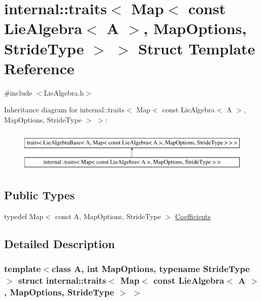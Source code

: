 \hypertarget{structinternal_1_1traits_3_01_map_3_01const_01_lie_algebra_3_01_a_01_4_00_01_map_options_00_01_stride_type_01_4_01_4}{}\section{internal\+:\+:traits$<$ Map$<$ const Lie\+Algebra$<$ A $>$, Map\+Options, Stride\+Type $>$ $>$ Struct Template Reference}
\label{structinternal_1_1traits_3_01_map_3_01const_01_lie_algebra_3_01_a_01_4_00_01_map_options_00_01_stride_type_01_4_01_4}


{\ttfamily \#include $<$Lie\+Algebra.\+h$>$}

Inheritance diagram for internal\+:\+:traits$<$ Map$<$ const Lie\+Algebra$<$ A $>$, Map\+Options, Stride\+Type $>$ $>$\+:\begin{figure}[H]
\begin{center}
\leavevmode
\includegraphics[height=2.000000cm]{structinternal_1_1traits_3_01_map_3_01const_01_lie_algebra_3_01_a_01_4_00_01_map_options_00_01_stride_type_01_4_01_4}
\end{center}
\end{figure}
\subsection*{Public Types}
\begin{DoxyCompactItemize}
\item 
typedef Map$<$ const A, Map\+Options, Stride\+Type $>$ \hyperlink{structinternal_1_1traits_3_01_map_3_01const_01_lie_algebra_3_01_a_01_4_00_01_map_options_00_01_stride_type_01_4_01_4_a674c3c33e67dbce98e62c32725b274da}{Coefficients}
\end{DoxyCompactItemize}


\subsection{Detailed Description}
\subsubsection*{template$<$class A, int Map\+Options, typename Stride\+Type$>$\newline
struct internal\+::traits$<$ Map$<$ const Lie\+Algebra$<$ A $>$, Map\+Options, Stride\+Type $>$ $>$}



